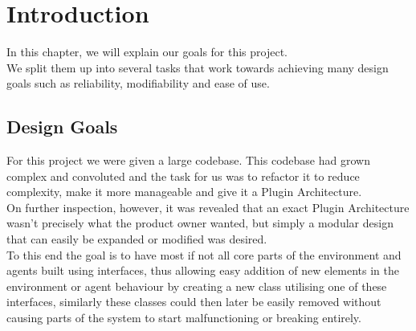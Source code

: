 \chapter{Introduction}

In this chapter, we will explain our goals for this project. \\
We split them up into several tasks that work towards achieving many design goals such as reliability, modifiability and ease of use.

\section{Design Goals}
For this project we were given a large codebase. This codebase had grown complex and convoluted and the task for us was to refactor it to reduce complexity, make it more manageable and give it a Plugin Architecture. \\
On further inspection, however, it was revealed that an exact Plugin Architecture wasn't precisely what the product owner wanted, but simply a modular design that can easily be expanded or modified was desired. \\
To this end the goal is to have most if not all core parts of the environment and agents built using interfaces, thus allowing easy addition of new elements in the environment or agent behaviour by creating a new class utilising one of these interfaces, similarly these classes could then later be easily removed without causing parts of the system to start malfunctioning or breaking entirely. \\

